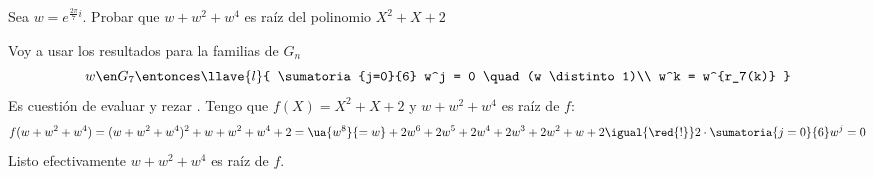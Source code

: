 \begin{enunciado}{\ejercicio}
  Sea $w = e^{\frac{2\pi}{7}i}$.
  Probar que $w + w^2 + w^4$ es raíz del polinomio $X^2 + X + 2$
\end{enunciado}

Voy a usar los resultados para la familias de $G_n$
$$
  w \en G_7 \entonces
  \llave{l}{
    \sumatoria{j=0}{6} w^j = 0 \quad (w \distinto 1)\\
    w^k = w^{r_7(k)}
  }
$$
Es cuestión de evaluar y rezar {\tiny{}}. Tengo que $f(X) = X^2 + X + 2$ y $w + w^2 + w^4$ es raíz de $f$:
$$
  f(w + w^2 + w^4) =
  (w + w^2 + w^4)^2 + w + w^2 + w^4 + 2 =
  \ua{w^8}{= w} + 2w^6 + 2w^5 + 2w^4 + 2w^3 + 2w^2 + w + 2
  \igual{\red{!}}
  2\cdot \sumatoria{j=0}{6}w^j = 0
$$
Listo efectivamente $w + w^2 + w^4$ es raíz de $f$.

\begin{aportes}
  \item {}
\end{aportes}
